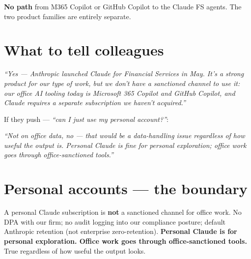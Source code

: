 \documentclass[10pt,a4paper]{article}
\newcommand{\hl}[1]{\textbf{\textcolor{accentpurple}{#1}}}
\begin{document}
\smallskip
\noindent\hl{No path} from M365 Copilot or GitHub Copilot to the Claude FS agents. The two product families are entirely separate.

\vfill
{}

\newpage

\section*{What to tell colleagues}

\begin{accentbox}
\textit{``Yes --- Anthropic launched Claude for Financial Services in May. It's a strong product for our type of work, but we don't have a sanctioned channel to use it: our office AI tooling today is Microsoft 365 Copilot and GitHub Copilot, and Claude requires a separate subscription we haven't acquired.''}
\end{accentbox}

\smallskip
\noindent If they push --- \textit{``can I just use my personal account?''}:

\begin{accentbox}
\textit{``Not on office data, no --- that would be a data-handling issue regardless of how useful the output is. Personal Claude is fine for personal exploration; office work goes through office-sanctioned tools.''}
\end{accentbox}

\section*{Personal accounts --- the boundary}

\begin{callout}
A personal Claude subscription is \hl{not} a sanctioned channel for office work. No DPA with our firm; no audit logging into our compliance posture; default Anthropic retention (not enterprise zero-retention). \textbf{Personal Claude is for personal exploration. Office work goes through office-sanctioned tools.} True regardless of how useful the output looks.
\end{callout}
\end{document}
